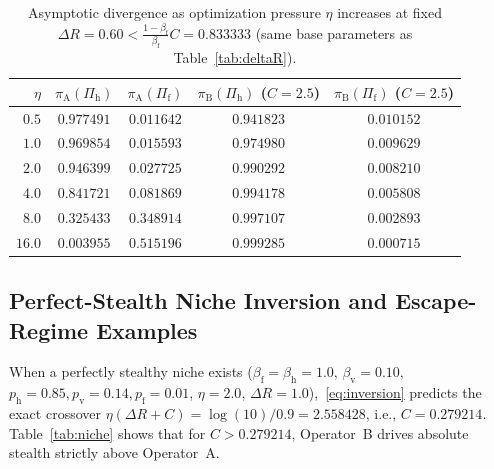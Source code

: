 \documentclass[11pt,a4paper]{article}
\begin{document}
\begin{table}[ht]
\centering
\caption{Asymptotic divergence as optimization pressure $\eta$ increases at fixed $\Delta R = 0.60 < \frac{1-\beta_{\mathrm{f}}}{\beta_{\mathrm{f}}}C = 0.833333$ (same base parameters as Table~\ref{tab:deltaR}).}
\label{tab:eta}
\small
\begin{tabular}{@{}rcccc@{}}
\toprule
$\eta$ & $\pi_{\mathrm{A}}(\Pi_{\mathrm{h}})$ & $\pi_{\mathrm{A}}(\Pi_{\mathrm{f}})$ & $\pi_{\mathrm{B}}(\Pi_{\mathrm{h}})$ ($C=2.5$) & $\pi_{\mathrm{B}}(\Pi_{\mathrm{f}})$ ($C=2.5$) \\
\midrule
$0.5$ & $0.977491$ & $0.011642$ & $0.941823$ & $0.010152$ \\
$1.0$ & $0.969854$ & $0.015593$ & $0.974980$ & $0.009629$ \\
$2.0$ & $0.946399$ & $0.027725$ & $0.990292$ & $0.008210$ \\
$4.0$ & $0.841721$ & $0.081869$ & $0.994178$ & $0.005808$ \\
$8.0$ & $0.325433$ & $0.348914$ & $0.997107$ & $0.002893$ \\
$16.0$ & $\mathbf{0.003955}$ & $\mathbf{0.515196}$ & $\mathbf{0.999285}$ & $\mathbf{0.000715}$ \\
\bottomrule
\end{tabular}
\end{table}

\subsection{Perfect-Stealth Niche Inversion and Escape-Regime Examples}

When a perfectly stealthy niche exists ($\beta_{\mathrm{f}} = \beta_{\mathrm{h}} = 1.0$, $\beta_{\mathrm{v}} = 0.10$, $p_{\mathrm{h}}=0.85, p_{\mathrm{v}}=0.14, p_{\mathrm{f}}=0.01$, $\eta = 2.0$, $\Delta R = 1.0$),~\eqref{eq:inversion} predicts the exact crossover $\eta(\Delta R + C) = \log(10)/0.9 = 2.558428$, i.e., $C = 0.279214$. Table~\ref{tab:niche} shows that for $C > 0.279214$, Operator~B drives absolute stealth strictly above Operator~A.
\end{document}
